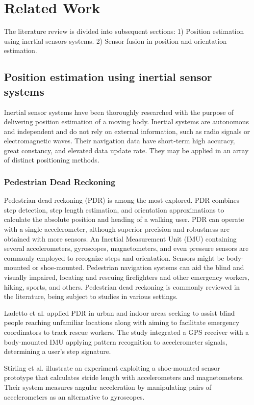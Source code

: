 \section{Related Work}
The literature review is divided into subsequent sections: 1) Position estimation using inertial sensors systems. 2) Sensor fusion in position and orientation estimation.
\subsection{Position estimation using inertial sensor systems}

Inertial sensor systems have been thoroughly researched with the purpose of delivering position estimation of a moving body. Inertial systems are autonomous and independent and do not rely on external information, such as radio signals or electromagnetic waves. Their navigation data have short-term high accuracy, great constancy, and elevated data update rate. They may be applied in an array of distinct positioning methods.
\subsubsection{Pedestrian Dead Reckoning}

Pedestrian dead reckoning (PDR) is among the most explored. PDR combines step detection, step length estimation, and orientation approximations to calculate the absolute position and heading of a walking user. PDR can operate with a single accelerometer, although superior precision and robustness are obtained with more sensors. An Inertial Measurement Unit (IMU) containing several accelerometers, gyroscopes, magnetometers, and even pressure sensors are commonly employed to recognize steps and orientation. Sensors might be body-mounted or shoe-mounted. Pedestrian navigation systems can aid the blind and visually impaired, locating and rescuing firefighters and other emergency workers, hiking, sports, and others. Pedestrian dead reckoning is commonly reviewed in the literature, being subject to studies in various settings.

Ladetto et al. \cite{ladetto2002step} applied PDR in urban and indoor areas seeking to assist blind people reaching unfamiliar locations along with aiming to facilitate emergency coordinators to track rescue workers. The study integrated a GPS receiver with a body-mounted IMU applying pattern recognition to accelerometer signals, determining a user’s step signature.

Stirling et al. \cite{stirling2003innovative} illustrate an experiment exploiting a shoe-mounted sensor prototype that calculates stride length with accelerometers and magnetometers. Their system measures angular acceleration by manipulating pairs of accelerometers as an alternative to gyroscopes.

